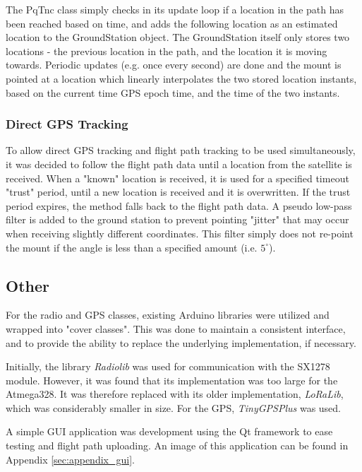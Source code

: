 The PqTnc class simply checks in its update loop if a location in the path has been reached based on time, and adds the following location as an estimated location to the GroundStation object. The GroundStation itself only stores two locations - the previous location in the path, and the location it is moving towards. Periodic updates (e.g. once every second) are done and the mount is pointed at a location which linearly interpolates the two stored location instants, based on the current time GPS epoch time, and the time of the two instants.

\subsubsection{Direct GPS Tracking}
To allow direct GPS tracking and flight path tracking to be used simultaneously, it was decided to follow the flight path data until a location from the satellite is received. When a "known" location is received, it is used for a specified timeout "trust" period, until a new location is received and it is overwritten. If the trust period expires, the method falls back to the flight path data. A pseudo low-pass filter is added to the ground station to prevent pointing "jitter" that may occur when receiving slightly different coordinates. This filter simply does not re-point the mount if the angle is less than a specified amount (i.e. $5^{\circ}$).

\subsection{Other}
For the radio and GPS classes, existing Arduino libraries were utilized and wrapped into "cover classes". This was done to maintain a consistent interface, and to provide the ability to replace the underlying implementation, if necessary.

Initially, the library \textit{Radiolib} was used for communication with the SX1278 module. However, it was found that its implementation was too large for the Atmega328. It was therefore replaced with its older implementation, \textit{LoRaLib}, which was considerably smaller in size. For the GPS, \textit{TinyGPSPlus} was used.

A simple GUI application was development using the Qt framework to ease testing and flight path uploading. An image of this application can be found in Appendix \ref{sec:appendix_gui}.
